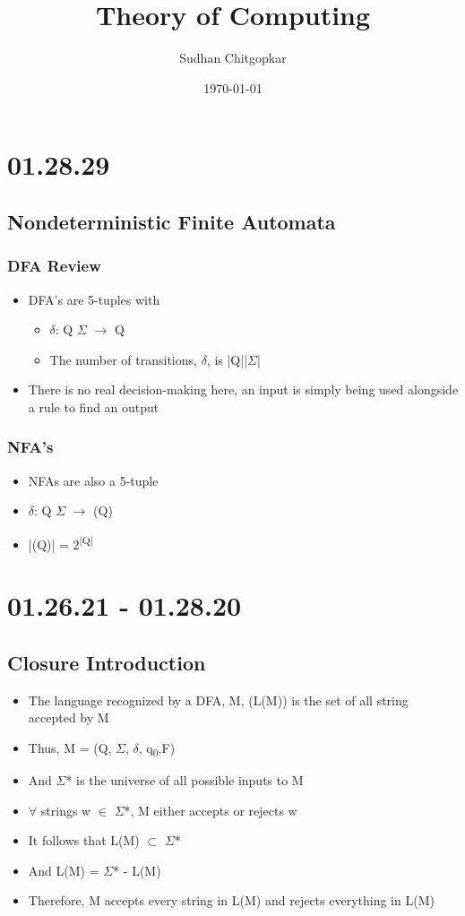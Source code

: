 \documentclass[11pt]{article}
\author{Sudhan Chitgopkar}
\date{\today}
\title{Theory of Computing}
\begin{document}
\maketitle
\tableofcontents \clearpage\section{01.28.29}
\label{sec:org7880746}
\subsection{Nondeterministic Finite Automata}
\label{sec:org1b57d0b}
\subsubsection{DFA Review}
\label{sec:org5bad897}
\begin{itemize}
\item DFA's are 5-tuples with
\begin{itemize}
\item \(\delta\): Q \texttimes{} \(\Sigma\) \(\to\) Q
\item The number of transitions, \(\delta\), is |Q||\(\Sigma\)|
\end{itemize}
\item There is no real decision-making here, an input is simply being used alongside a rule to find an output
\end{itemize}
\subsubsection{NFA's}
\label{sec:orgaf6f310}
\begin{itemize}
\item NFAs are also a 5-tuple
\item \(\delta\): Q \texttimes{} \(\Sigma\) \(\to\) (Q)
\item |(Q)| = 2\textsuperscript{|Q|}
\end{itemize}
\section{01.26.21 - 01.28.20}
\label{sec:orga0827d5}
\subsection{Closure Introduction}
\label{sec:org9dd4d5c}
\begin{itemize}
\item The language recognized by a DFA, M, (L(M)) is the set of all string accepted by M
\item Thus, M = (Q, \(\Sigma\), \(\delta\), q\textsubscript{0},F)
\item And \(\Sigma\)* is the universe of all possible inputs to M
\item \(\forall\) strings w \(\in\) \(\Sigma\)*, M either accepts or rejects w
\item It follows that L(M) \(\subset\) \(\Sigma\)*
\item And \textlnot{} L(M) = \(\Sigma\)* - L(M)
\item Therefore, M accepts every string in L(M) and rejects everything in \textlnot{} L(M)
\end{itemize}
\end{document}
